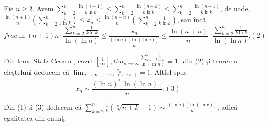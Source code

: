 \documentclass[a4paper,12pt,oneside]{report}
\begin{document}
Fie \(n\geq 2\). Avem \(\sum_{k=2}^{n}\frac{\ln \left ( n+1 \right )}{k\ln k}\leq \sum_{k=2}^{n}\frac{\ln \left ( n+k \right )}{k\ln k}\leq \sum_{k=2}^{n}\frac{\ln \left ( n+1 \right )}{k\ln k}\), de unde, 
\(\frac{\ln \left ( n+1 \right )}{n}\left ( \sum_{k=2}^{n}\frac{1}{k\ln k } \right )\leq x_{n}\leq \frac{\ln \left ( n+n \right )}{n}\left ( \sum_{k=2}^{n}\frac{1}{k\ln k } \right )\), sau \^ inc\u a, 
\begin{displaymath}
  frac{\ln \left ( n+1 \right )}{n}\cdot \frac{\sum_{k=2}^{n}\frac{1}{k\ln k }}{\ln \left ( \ln n \right )}\leq \frac{x_{n}}{\frac{\left ( \ln n \right )\left [ \ln\left ( \ln n \right ) \right ]}{n}}\leq \frac{\ln \left ( n+n \right )}{n}\cdot \frac{\sum_{k=2}^{n}\frac{1}{k\ln k }}{\ln \left ( \ln n \right )}. (2)
\end{displaymath}


Din lema Stolz-Cesaro , cazul \(\left [ \frac{1}{\infty } \right ], lim_{n \to \infty }\frac{\sum_{k=1}^{n}\frac{1}{k\ln k}}{\ln\left ( \ln n \right ) } = 1,\) din (2) \c si teorema cle\c steluui deducem c\u a \(\lim_{n \to \infty }\frac{x_{n}}{\frac{\left ( \ln n  \right )\left [ \ln\left ( \ln n \right ) \right ]}{n}} = 1\). Altfel spus 
\begin{displaymath}
  x_{n}\sim \frac{\left ( \ln n \right )\left [ \ln\left ( \ln n \right ) \right ]}{n}. (3)
\end{displaymath}

Din (1) \c si (3) deducem c\u a \(\sum_{k=2}^{n}\frac{1}{k}\left ( \sqrt[n]{n+k}-1 \right )\sim \frac{\left ( \ln n \right )\left [ \ln\left ( \ln n \right ) \right ]}{n}\), adic\u a egalitatea din enun\c t. \cite{dumitru}



\setlength{\baselineskip}{\normalbaselineskip}
\setlength{\parskip}{0pt}

\end{document}

